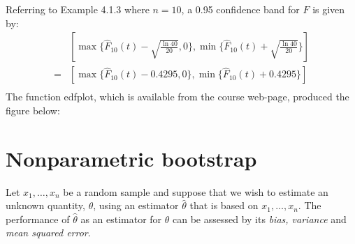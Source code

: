 \begin{example}
Referring to Example 4.1.3 where $n = 10$, a 0.95 confidence band for $F$ is given by:
\begin{displaymath}\begin{split}
&[\max\{\hat{F}_10(t)-\sqrt{\frac{\ln 40}{20}},0\},\min\{\hat{F}_10(t)+\sqrt{\frac{\ln 40}{20}}\}]\\
=&[\max\{\hat{F}_10(t)-0.4295,0\},\min\{\hat{F}_10(t)+0.4295\}]\\
\end{split}\end{displaymath}
The function edfplot, which is available from the course web-page, produced the figure below:
\end{example}

\section{Nonparametric bootstrap}
\work
Let $x_1,\ldots,x_n$ be a random sample and suppose that we wish to estimate an unknown quantity, $\theta$, using an estimator $\hat{\theta}$ that is based on $x_1,\ldots,x_n$. The performance of $\hat{\theta}$ as an estimator for $\theta$ can be assessed by its {\it bias, variance} and {\it mean squared error}.


